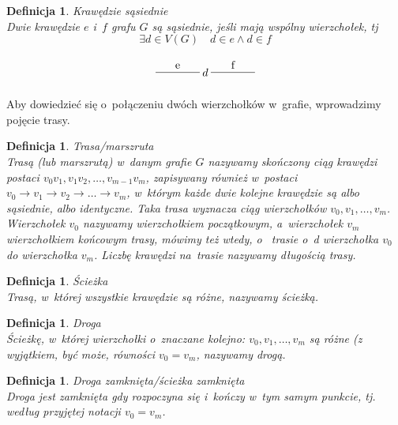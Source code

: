 \documentclass[12pt,a4paper]{report}
\newtheorem{definition}[theorem]{Definicja}
\begin{document}
\begin{definition}{Krawędzie sąsiednie \cite[Rozdział 2]{wilson2008}}\\
Dwie krawędzie $e$ i~$f$ grafu $G$ są sąsiednie, jeśli mają wspólny wierzchołek, tj
$$
\exists{d}\in V(G) \quad d \in e \land d\in f
$$

$$
\begin{tikzpicture}[scale=.7]
  \draw (-1.75,0)-- node[above] {f} ++(2,0);
  \draw node(d) at (-2,0) {$d$};
  \draw (-4.25,0) --node[above] {e} ++(2,0);
\end{tikzpicture}
$$
\end{definition}



Aby dowiedzieć się o~połączeniu dwóch wierzchołków w~grafie, wprowadzimy pojęcie trasy.

\begin{definition}{Trasa/marszruta \cite[Rozdział 3]{wilson2008}}\\
Trasą (lub marszrutą) w~danym grafie $G$ nazywamy skończony ciąg krawędzi postaci \newline
$v_{0}v_{1}, v_{1}v_{2}, \ldots,v_{m-1}v_{m}$, zapisywany również w~postaci $v_{0} \rightarrow{} v_{1} \rightarrow{} v_{2} \rightarrow{} \ldots \rightarrow{} v_{m}$, w~którym każde dwie kolejne krawędzie są albo sąsiednie, albo identyczne. Taka trasa wyznacza ciąg wierzchołków $v_{0}, v_{1}, \ldots, v_{m}$. Wierzchołek $v_{0}$ nazywamy wierzchołkiem początkowym, a~wierzchołek $v_{m}$ wierzchołkiem końcowym trasy, mówimy też wtedy, o~ trasie o~d wierzchołka $v_{0}$ do wierzchołka $v_{m}$. Liczbę krawędzi na~trasie nazywamy długością trasy. 
\end{definition}

\begin{definition}{Ścieżka \cite[Rozdział 3]{wilson2008}}\\
Trasą, w~której wszystkie krawędzie są różne, nazywamy ścieżką.
\end{definition}


\begin{definition}{Droga \cite[Rozdział 3]{wilson2008}}\\
Ścieżkę, w~której wierzchołki  o~znaczane kolejno: 
$v_{0}, v_{1}, \ldots, v_{m}$ są różne (z wyjątkiem, być może, równości $v_{0}=v_{m}$, nazywamy drogą. 
\end{definition}


\begin{definition}{Droga zamknięta/ścieżka zamknięta \cite[Rozdział 3]{wilson2008}}\\
Droga jest zamknięta gdy rozpoczyna się i~kończy w~tym samym punkcie, tj. według przyjętej notacji $v_{0}=v_{m}$.
\end{definition}
\end{document}
